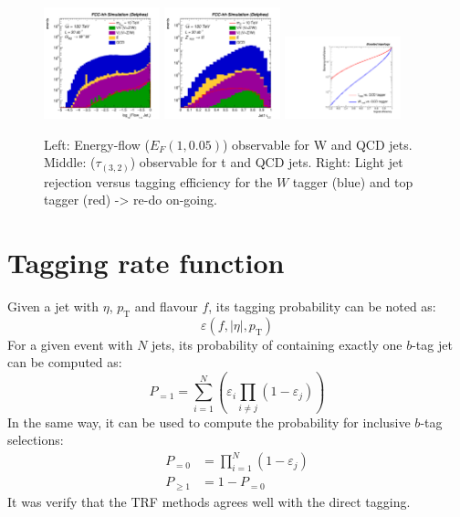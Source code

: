\documentclass[a4paper,11pt]{article}
\newcommand{\pt}{\ensuremath{p_{\text{T}}}}
\begin{document}
\begin{figure}[!htbp]\centering
\includegraphics[width=0.3\textwidth]{Fig/TMVA/Jet1_Flow15_sel0_nostack_logx-eps-converted-to.pdf}
\includegraphics[width=0.3\textwidth]{Fig/TMVA/Jet1_tau32_sel0_nostack_log-eps-converted-to.pdf}
\includegraphics[width=0.3\textwidth]{Fig/TMVA/effQCD_vs_effWhadBlue_thadRed_log.pdf}
\caption{Left: Energy-flow ($E_{F}(1,0.05)$) observable for W and QCD jets. Middle: ($\tau_(3,2)$) observable for t and QCD jets. Right: Light jet rejection versus tagging efficiency for the $W$ tagger (blue) and top tagger (red) -> re-do on-going.}
\label{fig:TMVA_final_result}
\end{figure}


\section{Tagging rate function}%
\label{sec:app:trf}
Given a jet with $\eta$, $\pt$ and flavour $f$, its tagging probability can be noted as:
\begin{equation*}
	\varepsilon \left(f,|\eta|,\pt\right)
\end{equation*}
\newline
For a given event with $N$ jets, its probability of containing exactly one $b$-tag jet can be computed as:
\begin{equation*}
	P_{=1} = \sum\limits_{i=1}^N \left( \varepsilon_{i} \prod\limits_{i \neq j} \left( 1 - \varepsilon_{j} \right) \right)
\end{equation*}
\newline
In the same way, it can be used to compute the probability for inclusive $b$-tag selections:
\begin{align*}
	P_{=0} &= \prod\limits_{i=1}^N \left( 1 - \varepsilon_{j} \right) \\
	P_{\geq 1} &= 1 - P_{=0}
\end{align*}
\newline
It was verify that the TRF methods agrees well with the direct tagging.
\end{document}
